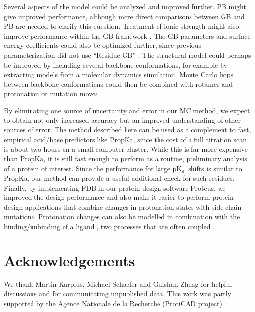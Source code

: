 \documentclass[a4paper,12pt]{article}
\newcommand{\pk}{pK$_a$}
\begin{document}
Several aspects of the model could be analyzed and improved further. PB might give improved performance, although more
direct comparisons between GB and PB are needed to clarify this question. Treatment of ionic strength might also improve
performance within the GB framework \cite{Srinivasan99,Polydorides13}. The GB parameters and surface energy coefficients
could also be optimized further, since previous parameterization did not use ``Residue GB'' \cite{Lopes07}. The structural
model could perhaps be improved by including several backbone conformations, for example by extracting models from a
molecular dynamics simulation. Monte Carlo hops between backbone conformations could then be combined with rotamer and
protonation or mutation moves \cite{Druart17}.

By eliminating one source of uncertainty and error in our MC method, we expect to obtain not only increased accuracy but an
improved understanding of other sources of error. The method described here can be used as a complement to fast, empirical
acid/base predictors like PropKa, since the cost of a full titration scan is about two hours on a small computer cluster.
While this is far more expensive than PropKa, it is still fast enough to perform as a routine, preliminary analysis of a
protein of interest. Since the performance for large \pk\ shifts is similar to PropKa, our method can provide a useful
additional check for such residues. Finally, by implementing FDB in our protein design software Proteus, we improved the
design performance and also make it easier to perform protein design applications that combine changes in protonation states
with side chain mutations. Protonation changes can also be modelled in combination with the binding/unbinding of a ligand
\cite{Druart16}, two processes that are often coupled \cite{Onufriev13,Petukh13}. 

\section*{Acknowledgements}
We thank Martin Karplus, Michael Schaefer and Guishan Zheng for helpful discussions and for communicating unpublished data.
This work was partly supported by the Agence Nationale de la Recherche (ProtiCAD project).

\small 

%
\normalsize
\clearpage

\end{document}
